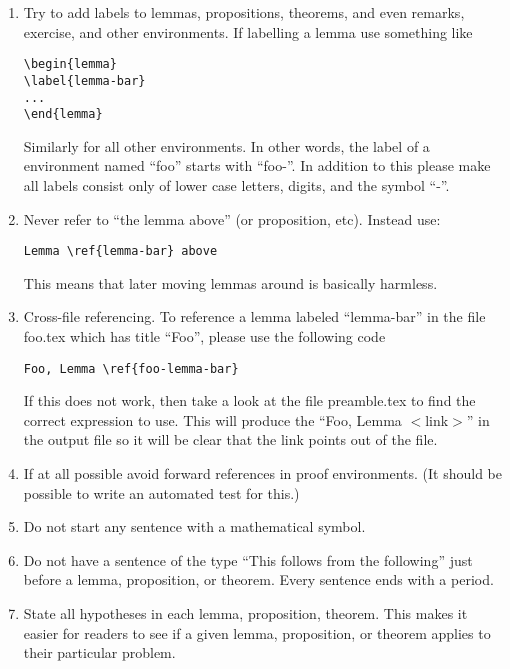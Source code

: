 \begin{enumerate}
\begin{verbatim}
\title{Title}
\maketitle
\tableofcontents
...
...




\end{verbatim}
\item Try to add labels to lemmas, propositions, theorems, and even
remarks, exercise, and other environments.
If labelling a lemma use something like
\begin{verbatim}
\begin{lemma}
\label{lemma-bar}
...
\end{lemma}
\end{verbatim}
Similarly for all other environments. In other words, the label
of a environment named ``foo'' starts with ``foo-''. In addition to
this please make all labels consist only of lower case letters,
digits, and the symbol ``-''.
\item Never refer to ``the lemma above'' (or proposition, etc).
Instead use:
\begin{verbatim}
Lemma \ref{lemma-bar} above
\end{verbatim}
This means that later
moving lemmas around is basically harmless.
\item Cross-file referencing. To reference a lemma labeled
``lemma-bar'' in the file foo.tex which has title
``Foo'', please use the following code
\begin{verbatim}
Foo, Lemma \ref{foo-lemma-bar}
\end{verbatim}
If this does not work, then take a look at the file
preamble.tex to find the correct expression to use.
This will produce the ``Foo, Lemma $<$link$>$'' in the
output file so it will be clear that the link points
out of the file.
\item If at all possible avoid forward references in proof
environments. (It should be possible to write an automated
test for this.)
\item Do not start any sentence with a mathematical symbol.
\item Do not have a sentence of the type ``This follows from
the following'' just before a lemma, proposition, or theorem.
Every sentence ends with a period.
\item State all hypotheses in each lemma, proposition, theorem.
This makes it easier for readers to see if a given
lemma, proposition, or theorem applies to their particular
problem.

\end{enumerate}
